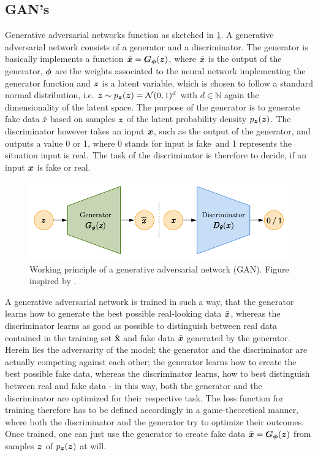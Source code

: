 \documentclass[a4paper,12pt]{report}
\begin{document}
\subsection{GAN's}
Generative adversarial networks function as sketched in \cref{fig:GAN}. A generative adversarial network consists of a generator and a discriminator. The generator is basically implements a function $\bar{\bm{x}} = \bm{G}_{\bm{\phi}}(\bm{z})$, where $\bar{\bm{x}}$ is the output of the generator, $\bm{\phi}$ are the weights associated to the neural network implementing the generator function and $\bm{z}$ is a latent variable, which is chosen to follow a standard normal distribution, i.e. $\bm{z} \sim p_{\bm{z}}(\bm{z}) = \mathcal{N}(0,1)^d$ with $d \in \mathbb{N}$ again the dimensionality of the latent space. The purpose of the generator is to generate fake data $\bar{x}$ based on samples $\bm{z}$ of the latent probability density $p_{\bm{z}}(\bm{z})$. The discriminator however takes an input $\bm{x}$, such as the output of the generator, and outputs a value 0 or 1, where 0 stands for \flqq input is fake\frqq\ and 1 represents the situation \flqq input is real\frqq.\ The task of the discriminator is therefore to decide, if an input $\bm{x}$ is fake or real.
\begin{figure}[h!]
\centering
\includegraphics[width=\linewidth-4cm]{figures/GAN.pdf}
\caption{Working principle of a generative adversarial network (GAN). Figure inspired by \cite{weng2018flow}.}
\label{fig:GAN}
\end{figure}

A generative adversarial network is trained in such a way, that the generator learns how to generate the best possible real-looking data $\bar{\bm{x}}$, whereas the discriminator learns as good as possible to distinguish between real data contained in the training set $\hat{\boldsymbol{\mathbf{x}}}$ and fake data $\bar{\bm{x}}$ generated by the generator. Herein lies the adversarity of the model; the generator and the discriminator are actually competing against each other; the generator learns how to create the best possible fake data, whereas the discriminator learns, how to best distinguish between real and fake data - in this way, both the generator and the discriminator are optimized for their respective task. The loss function for training therefore has to be defined accordingly in a game-theoretical manner, where both the discriminator and the generator try to optimize their outcomes. Once trained, one can just use the generator to create fake data $\bar{\bm{x}} = \bm{G}_{\bm{\phi}}(\bm{z})$ from samples $\bm{z}$ of $p_{\bm{z}}(\bm{z})$ at will.
\end{document}
